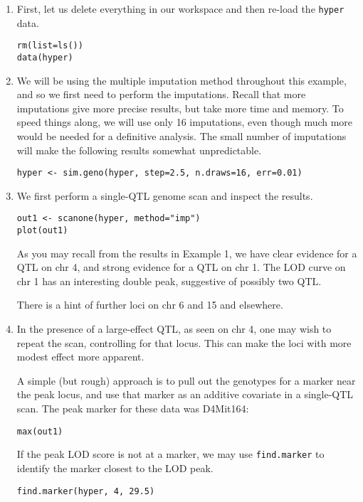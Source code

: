 \documentclass[10pt,letterpaper]{article}
\newcommand{\usercolor}{\color [named]{BlueViolet}}
\begin{document}
\begin{enumerate}
\item First, let us delete everything in our workspace and then
  re-load the \verb-hyper- data.

\usercolor \verb|rm(list=ls())| \\
\verb|data(hyper)| \normalcolor

\item We will be using the multiple imputation method throughout this
  example, and so we first need to perform the imputations.  Recall
  that more imputations give more precise results, but take more
  time and memory.  To speed things along, we will use only 16
  imputations, even though much more would be needed for a
  definitive analysis.  The small number of imputations will make the
  following results somewhat unpredictable.

\usercolor \verb|hyper <- sim.geno(hyper, step=2.5, n.draws=16, err=0.01)|
\normalcolor

\item We first perform a single-QTL genome scan and inspect the
  results.

\usercolor \verb|out1 <- scanone(hyper, method="imp")| \\
\verb|plot(out1)|
\normalcolor

As you may recall from the results in Example 1, we have clear evidence 
for a QTL on chr 4, and strong evidence for a QTL on chr 1.
The LOD curve on chr 1 has an interesting double peak, suggestive of
possibly two QTL.

There is a hint of further loci on chr 6 and 15 and elsewhere.

\item In the presence of a large-effect QTL, as seen on chr 4,
  one may wish to repeat the scan, controlling for that locus.  This
  can make the loci with more modest effect more apparent.  

  A simple (but rough) approach is to pull out the genotypes for a
  marker near the peak locus, and use that marker as an additive
  covariate in a single-QTL scan.  The peak marker for these data was
  D4Mit164:

  \usercolor \verb|max(out1)| \normalcolor

  If the peak LOD score is not at a marker, we may use
  \verb-find.marker- to identify the marker closest to the LOD peak.  

  \usercolor \verb|find.marker(hyper, 4, 29.5)| \normalcolor


\end{enumerate}
\end{document}

